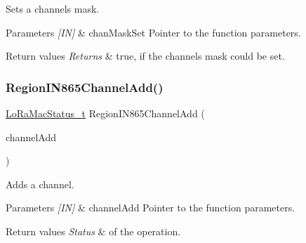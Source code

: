 Sets a channels mask. 


\begin{DoxyParams}{Parameters}
{\em \mbox{[}\+I\+N\mbox{]}} & chan\+Mask\+Set Pointer to the function parameters.\\
\hline
\end{DoxyParams}

\begin{DoxyRetVals}{Return values}
{\em Returns} & true, if the channels mask could be set. \\
\hline
\end{DoxyRetVals}
\mbox{\label{group__REGIONIN865_ga409780ea153146450bde780493f00b1b}} 
\subsubsection{\texorpdfstring{Region\+I\+N865\+Channel\+Add()}{RegionIN865ChannelAdd()}}
{\footnotesize\ttfamily \hyperlink{group__LORAMAC_ga30bd25657e10480f8605ee951b0ecfbd}{Lo\+Ra\+Mac\+Status\+\_\+t} Region\+I\+N865\+Channel\+Add (\begin{DoxyParamCaption}\item[{\hyperlink{group__REGION_gab1c5f3aa06614283202906cef4417860}{Channel\+Add\+Params\+\_\+t} $\ast$}]{channel\+Add }\end{DoxyParamCaption})}



Adds a channel. 


\begin{DoxyParams}{Parameters}
{\em \mbox{[}\+I\+N\mbox{]}} & channel\+Add Pointer to the function parameters.\\
\hline
\end{DoxyParams}

\begin{DoxyRetVals}{Return values}
{\em Status} & of the operation. \\
\hline
\end{DoxyRetVals}
\mbox{\label{group__REGIONIN865_ga06a432cedafb503d6e75757bc7d7e1b0}} 
